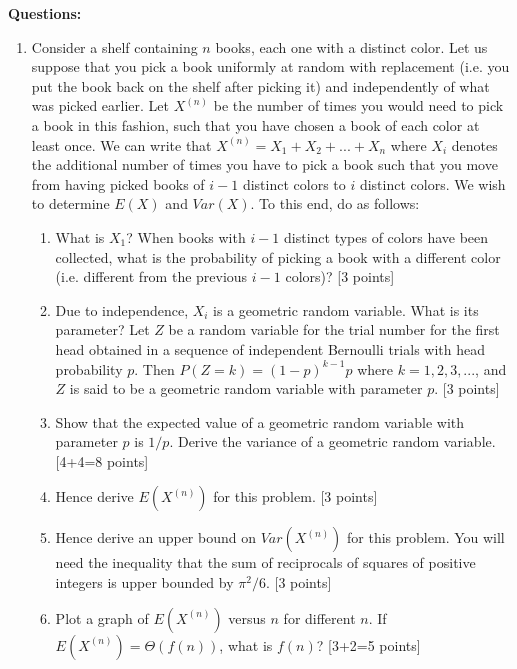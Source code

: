 \documentclass[11pt]{article}
\begin{document}
\textbf{Questions:}
\begin{enumerate}
\item Consider a shelf containing $n$ books, each one with a distinct color. Let us suppose that you pick a book uniformly at random with replacement (i.e. you put the book back on the shelf after picking it) and independently of what was picked earlier. Let $X^{(n)}$ be the number of times you would need to pick a book in this fashion, such that you have chosen a book of each color at least once. We can write that $X^{(n)} = X_1 + X_2 + ...+ X_n$ where $X_i$ denotes the additional number of times you have to pick a book such that you move from having picked books of $i-1$ distinct colors to $i$ distinct colors. We wish to determine $E(X)$ and $Var(X)$. To this end, do as follows:
\begin{enumerate}
\item What is $X_1$? When books with $i-1$ distinct types of colors have been collected, what is the probability of picking a book with a different color (i.e. different from the previous $i-1$ colors)? \textsf{[3 points]}
\item Due to independence, $X_i$ is a geometric random variable. What is its parameter? Let $Z$ be a random variable for the trial number for the first head obtained in a sequence of independent Bernoulli trials with head probability $p$. Then $P(Z = k) = (1-p)^{k-1} p$ where $k = 1,2,3,...$, and $Z$ is said to be a geometric random variable with parameter $p$.  \textsf{[3 points]}
\item Show that the expected value of a geometric random variable with parameter $p$ is $1/p$. Derive the variance of a geometric random variable.  \textsf{[4+4=8 points]}
\item Hence derive $E(X^{(n)})$ for this problem.  \textsf{[3 points]}
\item Hence derive an upper bound on $Var(X^{(n)})$ for this problem.  You will need the inequality that the sum of reciprocals of squares of positive integers is upper bounded by $\pi^2/6$.  \textsf{[3 points]}
\item Plot a graph of $E(X^{(n)})$ versus $n$ for different $n$. If $E(X^{(n)}) = \Theta(f(n))$, what is $f(n)$? \textsf{[3+2=5 points]}
\end{enumerate}


\end{enumerate}
\end{document}
